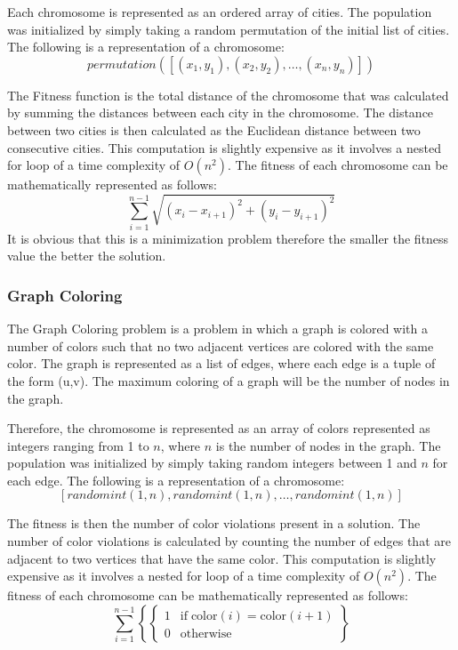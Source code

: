 \documentclass[11pt, letterpaper]{article}
\begin{document}
Each chromosome is represented as an ordered array of cities. The population was initialized by simply taking a random permutation of the initial list of cities. The following is a representation of a chromosome: 
$$permutation([(x_1, y_1), (x_2,y_2), \dots, (x_n, y_n)])$$

The Fitness function is the total distance of the chromosome that was calculated by summing the distances between each city in the chromosome. The distance between two cities is then calculated as the Euclidean distance between two consecutive cities. This computation is slightly expensive as it involves a nested for loop of a time complexity of $O(n^2)$. The fitness of each chromosome can be mathematically represented as follows:
$$\sum_{i=1}^{n-1} \sqrt{(x_i - x_{i+1})^2 + (y_i - y_{i+1})^2}$$
It is obvious that this is a minimization problem therefore the smaller the fitness value the better the solution.

\subsubsection{Graph Coloring}
The Graph Coloring problem is a problem in which a graph is colored with a number of colors such that no two adjacent vertices are colored with the same color. The graph is represented as a list of edges, where each edge is a tuple of the form (u,v). The maximum coloring of a graph will be the number of nodes in the graph.

Therefore, the chromosome is represented as an array of colors represented as integers ranging from 1 to $n$, where $n$ is the number of nodes in the graph. The population was initialized by simply taking random integers between 1 and $n$ for each edge. The following is a representation of a chromosome:
$$[randomint(1,n), randomint(1,n), \dots, randomint(1,n)]$$

The fitness is then the number of color violations present in a solution. The number of color violations is calculated by counting the number of edges that are adjacent to two vertices that have the same color. This computation is slightly expensive as it involves a nested for loop of a time complexity of $O(n^2)$. The fitness of each chromosome can be mathematically represented as follows:
$$\sum_{i=1}^{n-1} \left\{ \left\{ \begin{array}{ll} 1 & \text{if} \; \text{color}(i) = \text{color}(i+1) \\ 0 & \text{otherwise} \end{array} \right. \right\}$$
\end{document}
